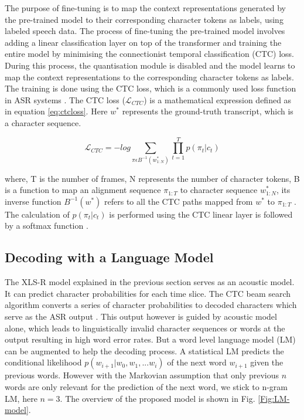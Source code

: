 \documentclass[runningheads]{llncs}
\begin{document}

The purpose of fine-tuning is to map the context representations generated by the pre-trained model to their corresponding character tokens as labels, using labeled speech data. The process of fine-tuning the pre-trained model involves adding a linear classification layer on top of the transformer and training the entire model by minimising the connectionist temporal classification (CTC) loss. During this process, the quantisation module is disabled and the model learns to map the context representations to the corresponding character tokens as labels. The training is done using the CTC loss, which is a commonly used loss function in ASR systems \cite{graves2006connectionist}. The CTC loss ($\mathcal{L}_{CTC}$) is a mathematical expression defined as in equation \ref{eq:ctcloss}. Here $w^*$ represents the ground-truth transcript, which is a character sequence.

\begin{equation}
\label{eq:ctcloss}
    \mathcal{L}_{CTC} = -log \sum_{\pi \epsilon B^{-1}(w^{*}_{1:N})}{\prod_{t=1}^{T}p(\pi_t|c_t)}
\end{equation}

where, T is the number of frames,  N represents the number of character tokens, B is a function to map an alignment sequence $\pi_{1:T}$ to character sequence $w^{*}_{1:N}$, its inverse function $B^{−1}(w^*)$ refers to all the CTC paths mapped from $w^*$ to $\pi_{1:T}$ . The calculation of $p(\pi_t|c_t)$ is performed using the CTC linear layer is followed by a softmax function \cite{graves2006connectionist,ou2022towards}.

\subsection{Decoding with a Language Model}

The XLS-R model explained in the previous section serves as an acoustic model. It can predict character probabilities for each time slice. The CTC beam search algorithm converts a series of character probabilities to decoded characters which serve as the ASR output \cite{graves2006connectionist}. This output however is guided by acoustic model alone, which leads to linguistically invalid character sequences or words at the output resulting in high word error rates. But a word level language model (LM) can be augmented to help the decoding process. A statistical LM predicts the conditional likelihood $p(w_{i+1}|w_0 , w_1 , ...w_i )$ of the next word $w_{i+1}$ given the previous words. However with the Markovian assumption that only previous $n$ words are only relevant for the prediction of the next word, we stick to n-gram LM, here $n=3$. The overview of the proposed model is shown in Fig. \ref{Fig:LM-model}.
\end{document}
